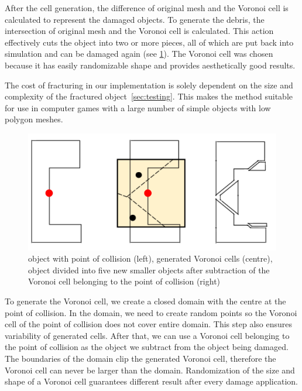 After the cell generation, the difference of original mesh and the Voronoi cell is calculated to represent the damaged objects. To generate the debris, the intersection of original mesh and the Voronoi cell is calculated. This action effectively cuts the object into two or more pieces, all of which are put back into simulation and can be damaged again (see \cref{fig:subtraction}). The Voronoi cell was chosen because it has easily randomizable shape and provides aesthetically good results.

The cost of fracturing in our implementation is solely dependent on the size and complexity of the fractured object~\cref{sec:testing}. This makes the method suitable for use in computer games with a large number of simple objects with low polygon meshes.

\begin{figure}
        \centering
        \includegraphics[width=\textwidth]{img/subtractionProcess}
        \caption{object with point of collision (left), generated Voronoi cells (centre), object divided into five new smaller objects after subtraction of the Voronoi cell belonging to the point of collision (right)}
        \label{fig:subtraction}
\end{figure}

To generate the Voronoi cell, we create a closed domain with the centre at the point of collision. In the domain, we need to create random points so the Voronoi cell of the point of collision does not cover entire domain. This step also ensures variability of generated cells. After that, we can use a Voronoi cell belonging to the point of collision as the object we subtract from the object being damaged. The boundaries of the domain clip the generated Voronoi cell, therefore the Voronoi cell can never be larger than the domain. Randomization of the size and shape of a Voronoi cell guarantees different result after every damage application.

